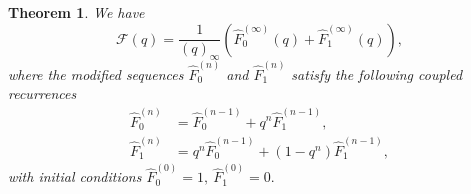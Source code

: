 \documentclass[10pt,a4paper]{amsart}
\newtheorem{theorem}{Theorem}
\begin{document}
\begin{theorem}\label{thm:euler-factorization} We have 
\begin{equation}
    \mathcal{F}(q)
= \frac{1}{(q)_\infty}
\left(
\widehat{F}_0^{(\infty)}(q) + \widehat{F}_1^{(\infty)}(q)
\right), 
\end{equation}
where the modified sequences $\widehat{F}_0^{(n)}$ and $\widehat{F}_1^{(n)}$ satisfy the following coupled recurrences  
\begin{align}
\widehat{F}_0^{(n)} &= \widehat{F}_0^{(n-1)} + q^n\widehat{F}_1^{(n-1)},\label{eq:FirstRec}\\
\widehat{F}_1^{(n)} &= q^n \widehat{F}_0^{(n-1)} + (1-q^n)\widehat{F}_1^{(n-1)},\label{eq:SecondRec}
\end{align}
with initial conditions \(\widehat{F}_0^{(0)}=1,\ \widehat{F}_1^{(0)}=0.\)
\end{theorem}
\end{document}
